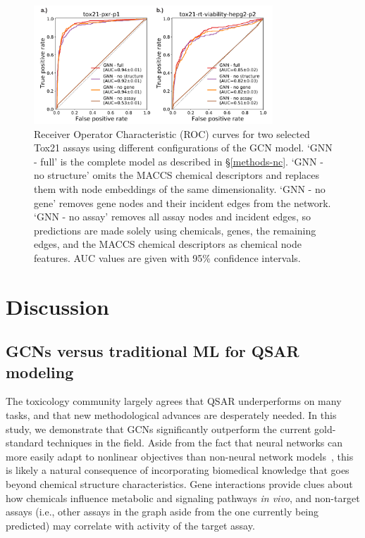 \documentclass{ws-procs11x85}
\begin{document}
\begin{figure}
   \centering
   \includegraphics[width=0.8\textwidth]{figures/figure5.pdf}
   \caption{Receiver Operator Characteristic (ROC) curves for two selected Tox21 assays using different configurations of the GCN model. `GNN - full' is the complete model as described in \S\ref{methods-nc}. `GNN - no structure' omits the MACCS chemical descriptors and replaces them with node embeddings of the same dimensionality. `GNN - no gene' removes gene nodes and their incident edges from the network. `GNN - no assay' removes all assay nodes and incident edges, so predictions are made solely using chemicals, genes, the remaining edges, and the MACCS chemical descriptors as chemical node features. AUC values are given with 95\% confidence intervals.}\label{fig:5}
\end{figure}

\section{Discussion}

\subsection{GCNs versus traditional ML for QSAR modeling}
The toxicology community largely agrees that QSAR underperforms on many tasks, and that new methodological advances are desperately needed.
In this study, we demonstrate that GCNs significantly outperform the current gold-standard techniques in the field.
Aside from the fact that neural networks can more easily adapt to nonlinear objectives than non-neural network models~\cite{hornik1989multilayer}, this is likely a natural consequence of incorporating biomedical knowledge that goes beyond chemical structure characteristics.
Gene interactions provide clues about how chemicals influence metabolic and signaling pathways \textit{in vivo}, and non-target assays (i.e., other assays in the graph aside from the one currently being predicted) may correlate with activity of the target assay.
\end{document}
